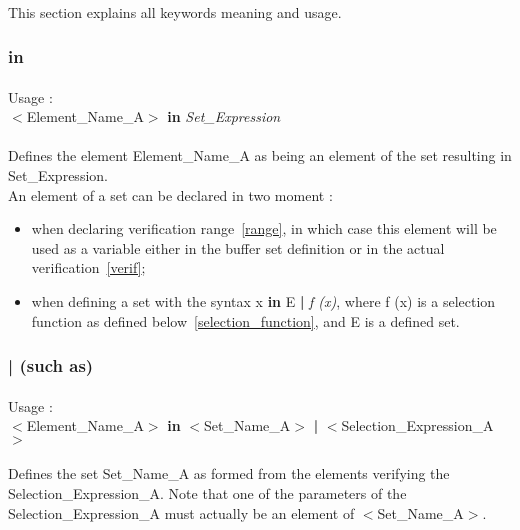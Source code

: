 \paragraph{}
This section explains all keywords meaning and usage.

\subsubsection {in}
\paragraph{}
Usage :\\
$<$Element\_Name\_A$>$ \textbf{in} \textit{Set\_Expression}\\

\paragraph{}
Defines the element Element\_Name\_A as being an element of the 
set resulting in Set\_Expression.\\
An element of a set can be declared in two moment : 
\begin {itemize}
\item when declaring verification range~\ref{range}, in which case 
this element will be used as a variable either in the buffer set 
definition or in the actual verification~\ref{verif};
\item when defining a set with the syntax x \textbf{in} E 
\textbf{|} \textit {f (x)}, where f (x) is a selection function 
as defined below~\ref {selection_function}, and E is a defined set.
\end {itemize}

\subsubsection {| (such as)}
\paragraph{}
Usage :\\
$<$Element\_Name\_A$>$ \textbf{in} $<$Set\_Name\_A$>$ \textbf{|} $<$Selection\_Expression\_A$>$

\paragraph{}
Defines the set Set\_Name\_A as formed from the elements verifying the Selection\_Expression\_A. Note that one of the parameters of the Selection\_Expression\_A must actually be an element of $<$Set\_Name\_A$>$.

